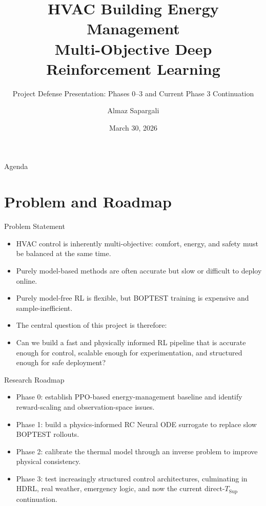 \documentclass[aspectratio=169,11pt]{beamer}
\title{HVAC Building Energy Management\\Multi-Objective Deep Reinforcement Learning}
\subtitle{Project Defense Presentation: Phases 0--3 and Current Phase 3 Continuation}
\author{Almaz Sapargali}
\date{March 30, 2026}
\begin{document}
\begin{frame}
  \titlepage
\end{frame}

\begin{frame}{Agenda}
  \tableofcontents
\end{frame}

\section{Problem and Roadmap}

\begin{frame}{Problem Statement}
  \begin{itemize}
    \item HVAC control is inherently multi-objective: comfort, energy, and safety must be balanced at the same time.
    \item Purely model-based methods are often accurate but slow or difficult to deploy online.
    \item Purely model-free RL is flexible, but BOPTEST training is expensive and sample-inefficient.
    \item The central question of this project is therefore:
    \item Can we build a fast and physically informed RL pipeline that is accurate enough for control, scalable enough for experimentation, and structured enough for safe deployment?
  \end{itemize}
\end{frame}

\begin{frame}{Research Roadmap}
  \begin{itemize}
    \item Phase 0: establish PPO-based energy-management baseline and identify reward-scaling and observation-space issues.
    \item Phase 1: build a physics-informed RC Neural ODE surrogate to replace slow BOPTEST rollouts.
    \item Phase 2: calibrate the thermal model through an inverse problem to improve physical consistency.
    \item Phase 3: test increasingly structured control architectures, culminating in HDRL, real weather, emergency logic, and now the current direct-$T_{\mathrm{Sup}}$ continuation.
  \end{itemize}
\end{frame}
\end{document}
